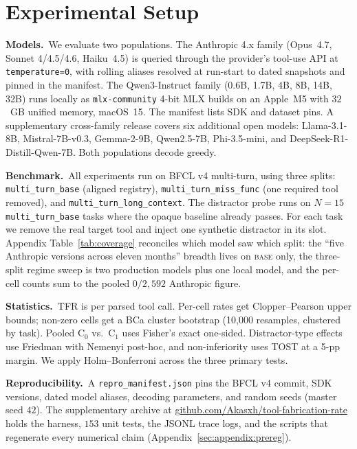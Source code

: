 \section{Experimental Setup}
\label{sec:setup}

\textbf{Models.}~We evaluate two populations. The Anthropic 4.x
family (Opus~4.7, Sonnet 4/4.5/4.6, Haiku~4.5) is queried through
the provider's tool-use API at \texttt{temperature=0}, with rolling
aliases resolved at run-start to dated snapshots and pinned in the
manifest. The Qwen3-Instruct family (0.6B, 1.7B, 4B, 8B, 14B, 32B)
runs locally as \texttt{mlx-community} 4-bit MLX builds on an
Apple~M5 with $32$~GB unified memory, macOS~15. The manifest lists
SDK and dataset pins. A supplementary cross-family release covers
six additional open models: Llama-3.1-8B, Mistral-7B-v0.3,
Gemma-2-9B, Qwen2.5-7B, Phi-3.5-mini, and
DeepSeek-R1-Distill-Qwen-7B. Both populations decode greedy.

\textbf{Benchmark.}~All experiments run on BFCL v4 multi-turn,
using three splits: \texttt{multi\_turn\_base} (aligned registry),
\texttt{multi\_turn\_miss\_func} (one required tool removed), and
\texttt{multi\_turn\_long\_context}. The distractor probe runs on
$N\!=\!15$ \texttt{multi\_turn\_base} tasks where the opaque
baseline already passes. For each task we remove the real target
tool and inject one synthetic distractor in its slot. Appendix
Table~\ref{tab:coverage} reconciles which model saw which split: the
``five Anthropic versions across eleven months'' breadth lives on
\textsc{base} only, the three-split regime sweep is two production
models plus one local model, and the per-cell counts sum to the pooled
$0/2{,}592$ Anthropic figure.

\textbf{Statistics.}~TFR is per parsed tool call. Per-cell rates
get Clopper--Pearson upper bounds; non-zero cells get a BCa cluster
bootstrap (10{,}000 resamples, clustered by task). Pooled
$\mathrm{C}_0$ vs.\ $\mathrm{C}_1$ uses Fisher's exact one-sided.
Distractor-type effects use Friedman with Nemenyi post-hoc, and
non-inferiority uses TOST at a 5-pp margin. We apply
Holm--Bonferroni across the three primary tests.

\textbf{Reproducibility.}~A \texttt{repro\_manifest.json} pins the
BFCL v4 commit, SDK versions, dated model aliases, decoding
parameters, and random seeds (master seed $42$). The supplementary
archive at
\href{https://github.com/Akasxh/tool-fabrication-rate}{github.com/Akasxh/tool-fabrication-rate}
holds the harness, $153$ unit tests, the JSONL trace logs, and the
scripts that regenerate every numerical claim
(Appendix~\ref{sec:appendix:prereg}).

